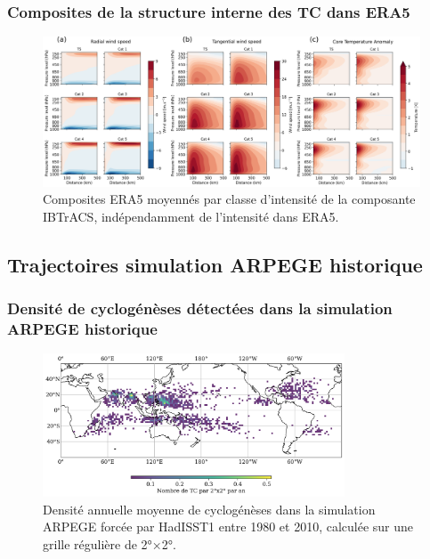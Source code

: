 \documentclass[aspectratio=169, usepdftitle=false, xcolor={dvipsnames}, 9pt,table]{beamer}
\begin{document}
\begin{frame}[t]
    \frametitle{Composites de la structure interne des TC dans ERA5}
    \begin{figure}
        \centering
        \includegraphics[width=\textwidth]{Figures/Annexes/all_composites.png}
        \caption{\small Composites ERA5 moyennés par classe d'intensité de la composante IBTrACS, indépendamment de l'intensité dans ERA5.}
    \end{figure}
\end{frame}

\subsection*{Trajectoires simulation ARPEGE historique}
\begin{frame}[c]
    \frametitle{Densité de cyclogénèses détectées dans la simulation ARPEGE historique}
    \begin{figure}
        \centering
        \includegraphics[width=0.8\textwidth]{Figures/Annexes/track_density_PRE625REFT359x.png}
        \caption{\small Densité annuelle moyenne de cyclogénèses dans la simulation ARPEGE forcée par HadISST1 entre 1980 et 2010, calculée sur une grille régulière de 2°×2°.}
    \end{figure}
    
\end{frame}
\end{document}
